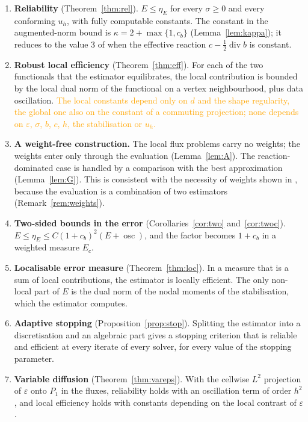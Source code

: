 \documentclass[11pt]{article}
\newcommand{\refe}[1]{\textcolor{orange}{#1}}   %
\newcommand{\eps}{\varepsilon}
\newcommand{\osc}{\operatorname{osc}}
\newcommand{\dv}{\operatorname{div}}
\theoremstyle{plain}
\theoremstyle{remark}
\numberwithin{equation}{section}
\begin{document}
\begin{enumerate}
  \item \textbf{Reliability} (Theorem~\ref{thm:rel}). $E\le\eta_E$ for every $\sigma\ge0$ and every
  conforming $u_h$, with fully computable constants. The constant in the augmented-norm bound is
  $\kappa=2+\max\{1,c_b\}$ (Lemma~\ref{lem:kappa}); it reduces to the value $3$ of \cite{EM16} when
  the effective reaction $c-\frac12\dv b$ is constant.
  \item \textbf{Robust local efficiency} (Theorem~\ref{thm:eff}). For each of the two functionals
  that the estimator equilibrates, the local contribution is bounded by the local dual norm of the
  functional on a vertex neighbourhood, plus data oscillation. \refe{The local constants depend only on $d$ and
  the shape regularity, the global one also on the constant of a commuting projection; none depends on
  $\eps$, $\sigma$, $b$, $c$, $h$, the stabilisation or $u_h$.}
  \item \textbf{A weight-free construction.} The local flux problems carry no weights; the weights
  enter only through the evaluation (Lemma~\ref{lem:A}). The reaction-dominated case is handled by a
  comparison with the best approximation (Lemma~\ref{lem:G}). This is consistent with the necessity
  of weights shown in \cite{SV20}, because the evaluation is a combination of two estimators
  (Remark~\ref{rem:weights}).
  \item \textbf{Two-sided bounds in the error} (Corollaries~\ref{cor:two} and~\ref{cor:twoc}).
  $E\le\eta_E\le C(1+c_b)^2(E+\osc)$, and the factor becomes $1+c_b$ in a weighted measure $E_c$.
  \item \textbf{Localisable error measure} (Theorem~\ref{thm:loc}). In a measure that is a sum of
  local contributions, the estimator is locally efficient. The only non-local part of $E$ is the dual
  norm of the nodal moments of the stabilisation, which the estimator computes.
  \item \textbf{Adaptive stopping} (Proposition~\ref{prop:stop}). Splitting the estimator into a
  discretisation and an algebraic part gives a stopping criterion that is reliable and efficient at
  every iterate of every solver, for every value of the stopping parameter.
  \item \textbf{Variable diffusion} (Theorem~\ref{thm:vareps}). With the cellwise $L^2$ projection of
  $\eps$ onto $P_1$ in the fluxes, reliability holds with an oscillation term of order $h^2$, and
  local efficiency holds with constants depending on the local contrast of $\eps$.
\end{enumerate}
\end{document}
